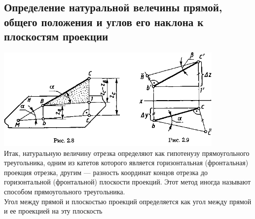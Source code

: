 \documentclass[a4paper, 12pt]{article}
\begin{document}
\subsection{Определение натуральной велечины прямой, общего положения и углов его наклона к плоскостям проекции}
\includegraphics{img/231.png}\\
Итак, натуральную величину отрезка определяют как гипотенузу прямоугольного треугольника, одним из катетов которого является горизонтальная (фронтальная) проекция отрезка, другим — разность координат концов отрезка до горизонтальной (фронтальной) плоскости проекций. Этот метод иногда называют способом прямоугольного треугольника.\\
Угол между прямой и плоскостью проекций определяется как угол между прямой и ее проекцией на эту плоскость
\end{document}
